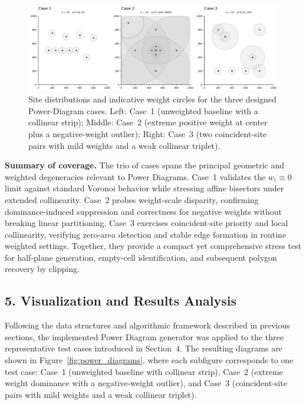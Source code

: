 \documentclass{article}
\begin{document}
\begin{figure}[H]
    \centering
    \includegraphics[width=0.95\linewidth]{Pictures/sites_cases.png}
    \caption{Site distributions and indicative weight circles for the three designed Power-Diagram cases. 
    Left: Case~1 (unweighted baseline with a collinear strip); 
    Middle: Case~2 (extreme positive weight at center plus a negative-weight outlier); 
    Right: Case~3 (two coincident-site pairs with mild weights and a weak collinear triplet).}
\end{figure}

\textbf{Summary of coverage.}
The trio of cases spans the principal geometric and weighted degeneracies relevant to Power Diagrams. 
Case~1 validates the $w_i\!\equiv\!0$ limit against standard Voronoi behavior while stressing affine bisectors under extended collinearity. 
Case~2 probes weight-scale disparity, confirming dominance-induced suppression and correctness for negative weights without breaking linear partitioning. 
Case~3 exercises coincident-site priority and local collinearity, verifying zero-area detection and stable edge formation in routine weighted settings. 
Together, they provide a compact yet comprehensive stress test for half-plane generation, empty-cell identification, and subsequent polygon recovery by clipping.

\subsection*{5. Visualization and Results Analysis}

Following the data structures and algorithmic framework described in previous sections, the implemented Power Diagram generator was applied to the three representative test cases introduced in Section~4.  
The resulting diagrams are shown in Figure~\ref{fig:power_diagrams}, where each subfigure corresponds to one test case:
Case~1 (unweighted baseline with collinear strip),
Case~2 (extreme weight dominance with a negative-weight outlier),
and Case~3 (coincident-site pairs with mild weights and a weak collinear triplet).
\end{document}
